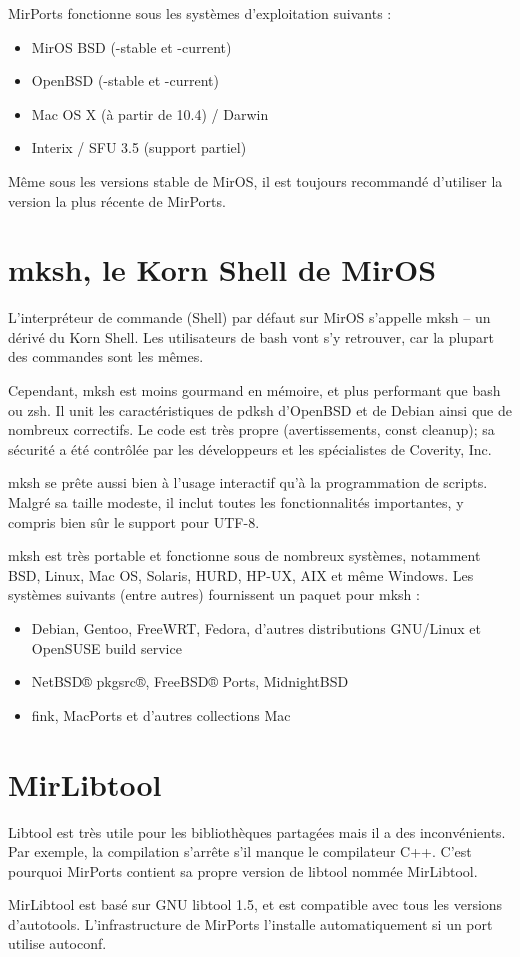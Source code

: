 \documentclass[a4paper,landscape,11pt,notumble]{leaflet}
\begin{document}
MirPorts fonctionne sous les systèmes d'exploitation suivants :
%
\begin{itemize}
\item MirOS BSD (-stable et -current)
\item OpenBSD (-stable et -current)
\item Mac OS X (à partir de 10.4) / Darwin
\item Interix / SFU 3.5 (support partiel)
\end{itemize}

\medskip
\noindent
Même sous les versions stable de MirOS, il est toujours recommandé d’utiliser la version la plus récente de MirPorts. 
\newpage

\section{mksh, le Korn Shell de MirOS}

\noindent
L’interpréteur de commande (Shell) par défaut sur MirOS s’appelle mksh – un dérivé du Korn Shell. Les utilisateurs de bash vont s’y retrouver, car la plupart des commandes sont les mêmes.

Cependant, mksh est moins gourmand en mémoire, et plus performant que bash ou zsh. Il unit les caractéristiques de pdksh d’OpenBSD et de Debian ainsi que de nombreux correctifs. Le code est très propre (avertissements, const cleanup); sa sécurité a été contrôlée par les développeurs et les spécialistes de Coverity, Inc.

mksh se prête aussi bien à l’usage interactif qu’à la programmation de scripts. Malgré sa taille modeste, il inclut toutes les fonctionnalités importantes, y compris bien sûr le support pour UTF-8.

mksh est très portable et fonctionne sous de nombreux systèmes, notamment BSD, Linux, Mac OS, Solaris, HURD, HP-UX, AIX et même Windows. Les systèmes suivants (entre autres) fournissent un paquet pour mksh :

\begin{itemize}
\item Debian, Gentoo, FreeWRT, Fedora, d’autres distributions GNU/Linux et OpenSUSE build service
\item NetBSD® pkgsrc®, FreeBSD® Ports, MidnightBSD
\item fink, MacPorts et d’autres collections Mac
\end{itemize}

\section{MirLibtool}

\noindent
Libtool est très utile pour les bibliothèques partagées mais il a des inconvénients. Par exemple, la compilation s’arrête s’il manque le compilateur C++. C’est pourquoi MirPorts contient sa propre version de libtool nommée MirLibtool.

MirLibtool est basé sur GNU libtool 1.5, et est compatible avec tous les versions d’autotools. L’infrastructure de MirPorts l’installe automatiquement  si un port utilise autoconf.
\end{document}
